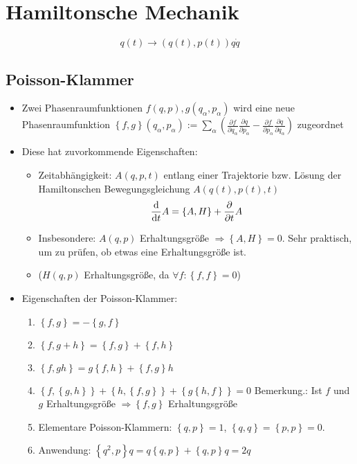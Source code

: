 \section{Hamiltonsche Mechanik}

$$
q(t) \rightarrow (q(t), p(t))
q\dot{q}
$$

\subsection{Poisson-Klammer}
\begin{itemize}
\item Zwei Phasenraumfunktionen $f(q,p), g(q_\alpha,p_\alpha)$ wird
  eine neue Phasenraumfunktion
  $\left\{ f,g \right\}(q_\alpha,p_\alpha) := \sum\limits_\alpha
  \left( \frac{\partial f}{\partial q_\alpha}\frac{\partial
      q}{\partial p_\alpha} - \frac{\partial f}{\partial
      p_\alpha}\frac{\partial q}{\partial q_\alpha} \right)$
  zugeordnet

\item Diese hat zuvorkommende Eigenschaften:
\begin{itemize}
\item Zeitabhängigkeit: $A(q,p,t)$ entlang einer Trajektorie
  bzw. Lösung der Hamiltonschen Bewegungsgleichung $A(q(t),p(t),t)$
$$\frac{\text{d} }{\text{d} t} A = \left\{ A,H \right\} + \frac{\partial }{\partial t}A$$
\item Insbesondere: $A(q,p)$ Erhaltungsgröße
  $\Rightarrow \left\{ A,H \right\}=0$.  Sehr praktisch, um zu prüfen,
  ob etwas eine Erhaltungsgröße ist.

\item ($H(q,p)$ Erhaltungsgröße, da
  $\forall f:\left\{ f,f \right\}=0$)
\end{itemize}

\item Eigenschaften der Poisson-Klammer:
  \begin{enumerate}
  \item\label{item:1} $\left\{ f,g \right\}=-\left\{ g,f \right\}$
  \item\label{item:2}
    $\left\{ f,g+h \right\}=\left\{ f,g \right\}+\left\{ f,h \right\}$
  \item\label{item:3}
    $\left\{ f,gh \right\}=g\left\{ f,h \right\} + \left\{ f,g
    \right\}h$
  \item\label{item:4}
    $\left\{ f,\left\{ g,h \right\} \right\} + \left\{ h ,\left\{f,g
      \right\} \right\} + \left\{ g\left\{ h,f \right\} \right\} = 0$
    Bemerkung.: Ist $f$ und $g$ Erhaltungsgröße
    $\Rightarrow \left\{ f,g \right\}$ Erhaltungsgröße
  \item\label{item:5} Elementare Poisson-Klammern:
    $\left\{ q,p \right\} = 1$,
    $\left\{ q,q \right\}=\left\{ p,p \right\}=0$.

  \item\label{item:6} Anwendung:
    $\left\{ q^2,p \right\}q = q \left\{ q,p \right\} + \left\{ q,p
    \right\}q = 2q$
  \end{enumerate}

\end{itemize}


